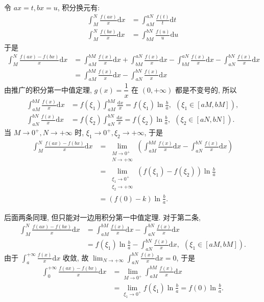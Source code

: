 令 $ax = t, bx = u$, 积分换元有:
\begin{align*}
\int_M^N\frac{f(ax)}{x}\mathrm{d}x &= \int_{aM}^{aN}\frac{f(t)}{t}\mathrm{d}t \\
\int_M^N\frac{f(bx)}{x}\mathrm{d}x &= \int_{bM}^{bN}\frac{f(u)}{u}\mathrm{d}u
\end{align*}
于是
\begin{align*}
\int_M^N\frac{f(ax) - f(bx)}{x}\mathrm{d}x &= \int_{aM}^{bM}\frac{f(x)}{x}\mathrm{d}x + \int_{bM}^{aN}\frac{f(x)}{x}\mathrm{d}x - \int_{bM}^{aN}\frac{f(x)}{x}\mathrm{d}x - \int_{aN}^{bN}\frac{f(x)}{x}\mathrm{d}x \\
&= \int_{aM}^{bM}\frac{f(x)}{x}\mathrm{d}x - \int_{aN}^{bN}\frac{f(x)}{x}\mathrm{d}x
\end{align*}
由推广的积分第一中值定理, $g(x) = \dfrac{1}{x}$ 在 $(0,+\infty)$ 都是不变号的, 所以
\begin{align*}
\int_{aM}^{bM}\frac{f(x)}{x}\mathrm{d}x &= f(\xi_1)\int_{aM}^{bM}\frac{\mathrm{d}x}{x} = f(\xi_1)\ln\frac{b}{a}, \ \ (\xi_1\in[aM, bM]) ,\\
\int_{aN}^{bN}\frac{f(x)}{x}\mathrm{d}x &= f(\xi_2)\int_{aN}^{bN}\frac{\mathrm{d}x}{x} = f(\xi_2)\ln\frac{b}{a}, \ \ (\xi_2\in[aN, bN]) .
\end{align*}
当 $M\to 0^+, N\to+\infty$ 时, $\xi_1\to 0^+, \xi_2\to+\infty$, 于是
\begin{align*}
\int_M^N\frac{f(ax) - f(bx)}{x}\mathrm{d}x &= \lim_{\substack{M\to 0^+ \\ N\to +\infty}}\left(\int_{aM}^{bM}\frac{f(x)}{x}\mathrm{d}x  - \int_{aN}^{bN}\frac{f(x)}{x}\mathrm{d}x \right)\\
&= \lim_{\substack{\xi_1\to 0^+ \\ \xi_2\to +\infty}}(f(\xi_1) - f(\xi_2))\ln\frac{b}{a}\\
&= (f(0) - k)\ln\frac{b}{a}.
\end{align*}

后面两条同理, 但只能对一边用积分第一中值定理. 对于第二条, 
\begin{align*}
\int_M^N\frac{f(ax) - f(bx)}{x}\mathrm{d}x &= \int_{aM}^{bM}\frac{f(x)}{x}\mathrm{d}x - \int_{aN}^{bN}\frac{f(x)}{x}\mathrm{d}x \\
&= f(\xi_1)\ln\frac{b}{a} - \int_{aN}^{bN}\frac{f(x)}{x}\mathrm{d}x, \ \ (\xi_1\in[aM,bM]).
\end{align*}
由于 $\displaystyle \int_{a}^{+\infty}\frac{f(x)}{x}\mathrm{d}x$ 收敛, 故 $\displaystyle \lim_{N\to+\infty}\int_{aN}^{bN}\frac{f(x)}{x}\mathrm{d}x = 0$, 于是
\begin{align*}
\int_0^{+\infty}\frac{f(ax) - f(bx)}{x}\mathrm{d}x &= \lim_{M\to0^+}\int_{aM}^{bM}\frac{f(x)}{x}\mathrm{d}x\\
&= \lim_{\xi_1\to0^+}f(\xi_1)\ln\frac{b}{a} = f(0)\ln\frac{b}{a}.
\end{align*}

